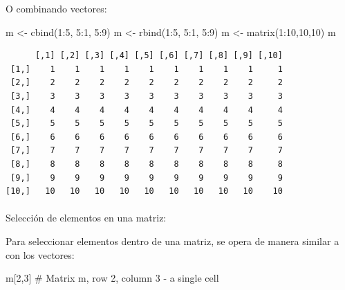 \documentclass[
  letterpaper,
  DIV=11,
  numbers=noendperiod]{scrartcl}
\makeatletter
\let\oldparagraph\paragraph
\renewcommand{\paragraph}{
    \@ifstar
      \xxxParagraphStar
      \xxxParagraphNoStar
  }
\newcommand{\xxxParagraphStar}[1]{\oldparagraph*{#1}\mbox{}}
\newcommand{\xxxParagraphNoStar}[1]{\oldparagraph{#1}\mbox{}}
\newenvironment{Shaded}{\begin{snugshade}}{\end{snugshade}}
\newcommand{\CommentTok}[1]{\textcolor[rgb]{0.37,0.37,0.37}{#1}}
\newcommand{\DecValTok}[1]{\textcolor[rgb]{0.68,0.00,0.00}{#1}}
\newcommand{\FunctionTok}[1]{\textcolor[rgb]{0.28,0.35,0.67}{#1}}
\newcommand{\NormalTok}[1]{\textcolor[rgb]{0.00,0.23,0.31}{#1}}
\newcommand{\OtherTok}[1]{\textcolor[rgb]{0.00,0.23,0.31}{#1}}
\newcommand{\SpecialCharTok}[1]{\textcolor[rgb]{0.37,0.37,0.37}{#1}}
\makeatother
\begin{document}
O combinando vectores:

\begin{Shaded}
\begin{Highlighting}[]
\NormalTok{m }\OtherTok{\textless{}{-}} \FunctionTok{cbind}\NormalTok{(}\DecValTok{1}\SpecialCharTok{:}\DecValTok{5}\NormalTok{, }\DecValTok{5}\SpecialCharTok{:}\DecValTok{1}\NormalTok{, }\DecValTok{5}\SpecialCharTok{:}\DecValTok{9}\NormalTok{)  }
\NormalTok{m }\OtherTok{\textless{}{-}} \FunctionTok{rbind}\NormalTok{(}\DecValTok{1}\SpecialCharTok{:}\DecValTok{5}\NormalTok{, }\DecValTok{5}\SpecialCharTok{:}\DecValTok{1}\NormalTok{, }\DecValTok{5}\SpecialCharTok{:}\DecValTok{9}\NormalTok{)  }
\NormalTok{m }\OtherTok{\textless{}{-}} \FunctionTok{matrix}\NormalTok{(}\DecValTok{1}\SpecialCharTok{:}\DecValTok{10}\NormalTok{,}\DecValTok{10}\NormalTok{,}\DecValTok{10}\NormalTok{)}
\NormalTok{m}
\end{Highlighting}
\end{Shaded}

\begin{verbatim}
      [,1] [,2] [,3] [,4] [,5] [,6] [,7] [,8] [,9] [,10]
 [1,]    1    1    1    1    1    1    1    1    1     1
 [2,]    2    2    2    2    2    2    2    2    2     2
 [3,]    3    3    3    3    3    3    3    3    3     3
 [4,]    4    4    4    4    4    4    4    4    4     4
 [5,]    5    5    5    5    5    5    5    5    5     5
 [6,]    6    6    6    6    6    6    6    6    6     6
 [7,]    7    7    7    7    7    7    7    7    7     7
 [8,]    8    8    8    8    8    8    8    8    8     8
 [9,]    9    9    9    9    9    9    9    9    9     9
[10,]   10   10   10   10   10   10   10   10   10    10
\end{verbatim}

\paragraph{Selección de elementos en una
matriz:}\label{selecciuxf3n-de-elementos-en-una-matriz}

Para seleccionar elementos dentro de una matriz, se opera de manera
similar a con los vectores:

\begin{Shaded}
\begin{Highlighting}[]
\NormalTok{m[}\DecValTok{2}\NormalTok{,}\DecValTok{3}\NormalTok{]  }\CommentTok{\# Matrix m, row 2, column 3 {-} a single cell}
\end{Highlighting}
\end{Shaded}
\end{document}
